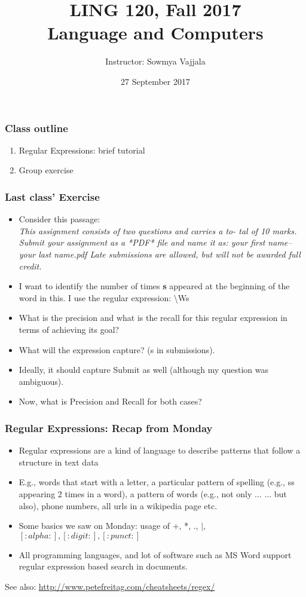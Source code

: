 \documentclass{beamer}
\author[Sowmya Vajjala]{Instructor: Sowmya Vajjala}
\title[LING 120]{LING 120, Fall 2017 \\ Language and Computers}
\date{27 September 2017}
\institute{Iowa State University, USA}
\begin{document}
\begin{frame}\titlepage
\end{frame}

\begin{frame}
\frametitle{Class outline}%
\begin{enumerate}
\item Regular Expressions: brief tutorial
\item Group exercise
\end{enumerate}
\end{frame} %

\begin{frame}
\frametitle{Last class' Exercise}
\begin{itemize}
\item Consider this passage: \\ \small 
\textit{This assignment consists of two questions and carries a to-
tal of 10 marks. Submit your assignment as a *PDF* file and name it as:
your first name–your last name.pdf Late submissions are allowed, but will
not be awarded full credit.} \normalsize
\item I want to identify the number of times \textbf{s} appeared at the beginning of the word in this. I use the regular expression: \textbackslash Ws
\item What is the precision and what is the recall for this regular expression in terms of achieving its goal? \pause
\item What will the expression capture? \pause (s in submissions).
\item Ideally, it should capture Submit as well (although my question was ambiguous).
\item Now, what is Precision and Recall for both cases?
\end{itemize}
\end{frame}

\begin{frame}
\frametitle{Regular Expressions: Recap from Monday}
\begin{itemize}
\item Regular expressions are a kind of language to describe patterns that follow a structure in text data
\item E.g., words that start with a letter, a particular pattern of spelling (e.g., ss appearing 2 times in a word), a pattern of words (e.g., not only ... ... but also), phone numbers, all urls in a wikipedia page etc.
\item Some basics we saw on Monday: usage of +, *, ., $|$, $[:alpha:], [:digit:], [:punct:]$ 
\item All programming languages, and lot of software such as MS Word support regular expression based search in documents.
\end{itemize}
See also: \url{http://www.petefreitag.com/cheatsheets/regex/}
\end{frame}
\end{document}
